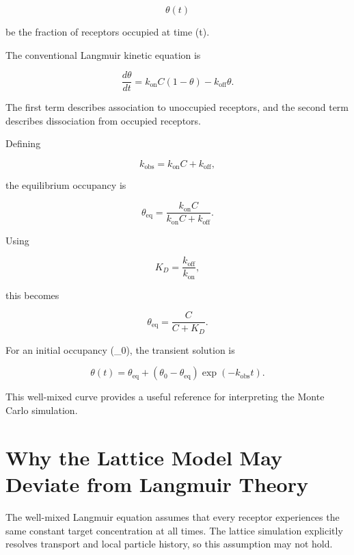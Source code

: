 \documentclass[11pt]{article}
\begin{document}
\begin{equation}
\theta(t)
\end{equation}

be the fraction of receptors occupied at time (t).

The conventional Langmuir kinetic equation is

\begin{equation}
\frac{d\theta}{dt}
=
k_{\mathrm{on}}C(1-\theta)
-
k_{\mathrm{off}}\theta.
\end{equation}

The first term describes association to unoccupied receptors, and the second term describes dissociation from occupied receptors.

Defining

\begin{equation}
k_{\mathrm{obs}}
=
k_{\mathrm{on}}C
+
k_{\mathrm{off}},
\end{equation}

the equilibrium occupancy is

\begin{equation}
\theta_{\mathrm{eq}}
=
\frac{k_{\mathrm{on}}C}
{k_{\mathrm{on}}C+k_{\mathrm{off}}}.
\end{equation}

Using

\begin{equation}
K_D
=
\frac{k_{\mathrm{off}}}{k_{\mathrm{on}}},
\end{equation}

this becomes

\begin{equation}
\boxed{
\theta_{\mathrm{eq}}
=
\frac{C}{C+K_D}
}.
\end{equation}

For an initial occupancy (\theta_0), the transient solution is

\begin{equation}
\boxed{
\theta(t)
=
\theta_{\mathrm{eq}}
+
\left(
\theta_0-\theta_{\mathrm{eq}}
\right)
\exp(-k_{\mathrm{obs}}t)
}.
\end{equation}

This well-mixed curve provides a useful reference for interpreting the Monte Carlo simulation.

\section{Why the Lattice Model May Deviate from Langmuir Theory}

The well-mixed Langmuir equation assumes that every receptor experiences the same constant target concentration at all times. The lattice simulation explicitly resolves transport and local particle history, so this assumption may not hold.
\end{document}

